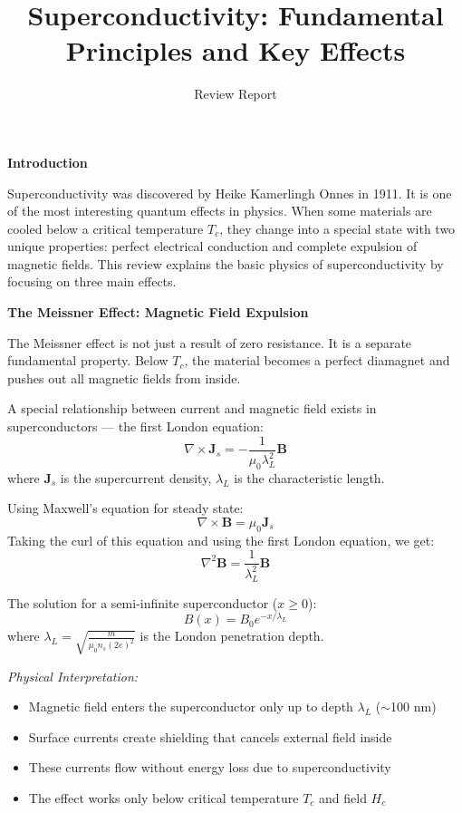 \documentclass[12pt]{article}
\title{Superconductivity: Fundamental Principles and Key Effects}
\author{Review Report}
\date{}
\begin{document}
	
	\maketitle
	
	\quad \textbf{Introduction}
	
	Superconductivity was discovered by Heike Kamerlingh Onnes in 1911. It is one of the most interesting quantum effects in physics. When some materials are cooled below a critical temperature $T_c$, they change into a special state with two unique properties: perfect electrical conduction and complete expulsion of magnetic fields. This review explains the basic physics of superconductivity by focusing on three main effects.
	
	\quad \textbf{The Meissner Effect: Magnetic Field Expulsion}
	
	The Meissner effect is not just a result of zero resistance. It is a separate fundamental property. Below $T_c$, the material becomes a perfect diamagnet and pushes out all magnetic fields from inside.
	
	A special relationship between current and magnetic field exists in superconductors — the first London equation:
	\[
	\nabla \times \mathbf{J}_s = -\frac{1}{\mu_0\lambda_L^2}\mathbf{B}
	\]
	where $\mathbf{J}_s$ is the supercurrent density, $\lambda_L$ is the characteristic length.
	
	Using Maxwell's equation for steady state:
	\[
	\nabla \times \mathbf{B} = \mu_0\mathbf{J}_s
	\]
	Taking the curl of this equation and using the first London equation, we get:
	\[
	\nabla^2\mathbf{B} = \frac{1}{\lambda_L^2}\mathbf{B}
	\]
	
	The solution for a semi-infinite superconductor ($x \geq 0$):
	\[
	B(x) = B_0 e^{-x/\lambda_L}
	\]
	where $\lambda_L = \sqrt{\frac{m}{\mu_0 n_s (2e)^2}}$ is the London penetration depth.
	
	\textit{Physical Interpretation:}
	\begin{itemize}
		\item Magnetic field enters the superconductor only up to depth $\lambda_L$ ($\sim$100 nm)
		\item Surface currents create shielding that cancels external field inside
		\item These currents flow without energy loss due to superconductivity
		\item The effect works only below critical temperature $T_c$ and field $H_c$
	\end{itemize}
	
\end{document}

